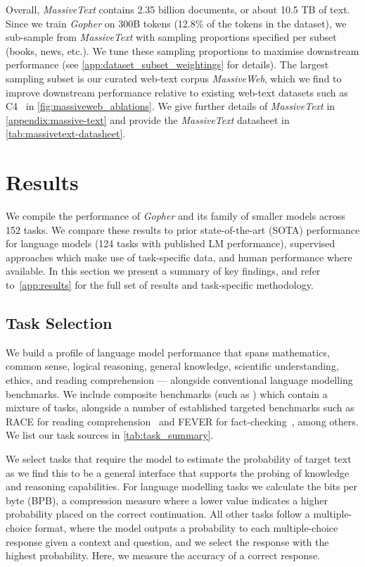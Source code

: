Overall, \textit{MassiveText} contains 2.35 billion documents, or about 10.5 TB of text. Since we train \textit{Gopher} on 300B tokens (12.8\% of the tokens in the dataset), we sub-sample from \textit{MassiveText} with sampling proportions specified per subset (books, news, etc.). We tune these sampling proportions to maximise downstream performance (see \autoref{app:dataset_subset_weightings} for details). The largest sampling subset is our curated web-text corpus \textit{MassiveWeb}, which we find to improve downstream performance relative to existing web-text datasets such as C4~\citep{raffel2020exploring} in \autoref{fig:massiveweb_ablations}. 
We give further details of \textit{MassiveText} in \autoref{appendix:massive-text} and provide the \textit{MassiveText} datasheet in \autoref{tab:massivetext-datasheet}.

\section{Results}
\label{sec:results}
We compile the performance of \textit{Gopher} and its family of smaller models across 152 tasks. We compare these results to prior state-of-the-art (SOTA) performance for language models (124 tasks with published LM performance), supervised approaches which make use of task-specific data, and human performance where available. In this section we present a summary of key findings, and refer to~\autoref{app:results} for the full set of results and task-specific methodology.  

\subsection{Task Selection}

We build a profile of language model performance that spans mathematics, common sense, logical reasoning, general knowledge, scientific understanding, ethics, and reading comprehension --- alongside conventional language modelling benchmarks. We include composite benchmarks (such as \citet{bigbench}) which contain a mixture of tasks, alongside a number of established targeted benchmarks such as RACE for reading comprehension~\citep{race} and FEVER for fact-checking~\citep{fever}, among others. We list our task sources in \autoref{tab:task_summary}.

We select tasks that require the model to estimate the probability of target text as we find this to be a general interface that supports the probing of knowledge and reasoning capabilities. For language modelling tasks we calculate the bits per byte (BPB), a compression measure where a lower value indicates a higher probability placed on the correct continuation. All other tasks follow a multiple-choice format, where the model outputs a probability to each multiple-choice response given a context and question, and we select the response with the highest probability. Here, we measure the accuracy of a correct response.   

